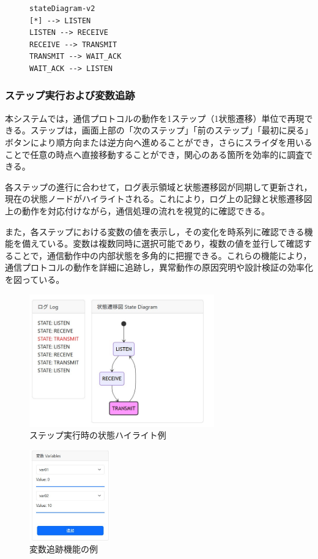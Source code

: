\documentclass[technicalreport]{ieicej}
\begin{document}
\begin{figure}[h]
\scriptsize
\begin{lstlisting}[caption={生成されたMermaid.jsフォーマットの例},label=mermaid-example]
stateDiagram-v2
[*] --> LISTEN
LISTEN --> RECEIVE
RECEIVE --> TRANSMIT
TRANSMIT --> WAIT_ACK
WAIT_ACK --> LISTEN
\end{lstlisting}
\end{figure}

\subsubsection{ステップ実行および変数追跡}
本システムでは，通信プロトコルの動作を1ステップ（1状態遷移）単位で再現できる。ステップは，画面上部の「次のステップ」「前のステップ」「最初に戻る」ボタンにより順方向または逆方向へ進めることができ，さらにスライダを用いることで任意の時点へ直接移動することができ，関心のある箇所を効率的に調査できる。

各ステップの進行に合わせて，ログ表示領域と状態遷移図が同期して更新され，現在の状態ノードがハイライトされる。これにより，ログ上の記録と状態遷移図上の動作を対応付けながら，通信処理の流れを視覚的に確認できる。

また，各ステップにおける変数の値を表示し，その変化を時系列に確認できる機能を備えている。変数は複数同時に選択可能であり，複数の値を並行して確認することで，通信動作中の内部状態を多角的に把握できる。これらの機能により，通信プロトコルの動作を詳細に追跡し，異常動作の原因究明や設計検証の効率化を図っている。

\begin{figure}[h]
\centering
\includegraphics[width=80mm]{./images/step_2.jpg}
\caption{ステップ実行時の状態ハイライト例}
\label{fig:viewer-ui-step}
\end{figure}

\begin{figure}[h]
\centering
\includegraphics[width=35mm]{./images/var_log2.jpg}
\caption{変数追跡機能の例}
\label{fig:var-tracking}
\end{figure}
\end{document}
